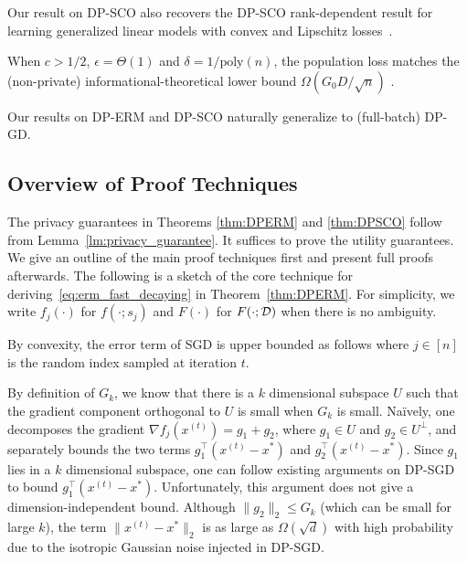 \begin{Remark}
Our result on DP-SCO also recovers the DP-SCO rank-dependent result for learning generalized linear models with convex and Lipschitz losses~\citep{song2021evading}.
\end{Remark}

\begin{Remark}
When $c>1/2$, $\epsilon = \Theta(1)$ and $\delta = 1/\mathrm{poly}(n)$, the population loss matches the (non-private) informational-theoretical lower bound $\Omega(G_0 D/\sqrt{n})$ \citep{agarwal2009information}.
\end{Remark}

\begin{Remark}
    Our results on DP-ERM and DP-SCO naturally generalize to (full-batch) DP-GD.
\end{Remark}

\subsection{Overview of Proof Techniques}\label{sec:proof_technique}
The privacy guarantees in Theorems \ref{thm:DPERM} and \ref{thm:DPSCO} follow from Lemma~\ref{lm:privacy_guarantee}.
It suffices to prove the utility guarantees. 
We give an outline of the main proof techniques first and present full proofs afterwards.
The following is a sketch of the core technique for deriving~\eqref{eq:erm_fast_decaying} in Theorem~\ref{thm:DPERM}.
For simplicity, we write $f_j(\cdot)$ for $f(\cdot;s_j)$ and $F(\cdot)$ for $F(\cdot;\mathcal D)$ when there is no ambiguity.

By convexity, the error term of SGD is upper bounded as follows
where $j \in [n]$ is the random index sampled at iteration $t$.

By definition of $G_{k}$, we know that there is a $k$ dimensional
subspace $U$ such that the gradient component orthogonal to $U$ is small when $G_k$ is small.
Na\"ively, one decomposes the gradient $\nabla f_{j}(x^{(t)})=g_{1}+g_{2}$,
where $g_{1}\in U$ and $g_{2}\in U^{\perp}$,
and separately bounds the two terms $g_1^\top (x^{(t)}-x^{*})$ and $g_2^\top (x^{(t)}-x^{*})$.
Since $g_{1}$ lies in a $k$ dimensional subspace, one can follow existing
arguments on DP-SGD to bound $g_{1}^{\top}(x^{(t)}-x^{*})$. 
Unfortunately, this argument does not give a dimension-independent bound.
Although
$\|g_{2}\|_{2}\leq G_{k}$ (which can be small for large $k$), the term
$\|x^{(t)}-x^{*}\|_{2}$ is as large as $\Omega(\sqrt{d})$ with high probability due
to the isotropic Gaussian noise injected in DP-SGD. 


